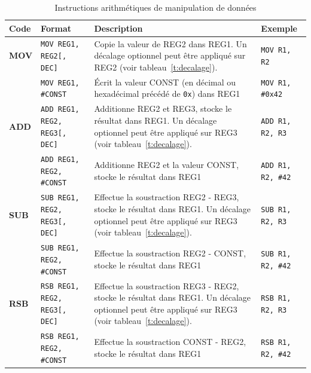 \documentclass{tufte-handout}
\begin{document}
\begin{table}
\begin{tabular}{l|l|p{7.5cm}l}
Code & Format & Description & Exemple \\ \hline
\textbf{MOV} & \texttt{MOV REG1, REG2[, DEC]} 	& Copie la valeur de REG2 dans REG1. Un décalage optionnel peut être appliqué sur REG2 (voir tableau~\ref{t:decalage}). & \texttt{MOV R1, R2} \\
 			 & \texttt{MOV REG1, \#CONST} 			& Écrit la valeur CONST (en décimal ou hexadécimal précédé de \texttt{0x}) dans REG1 & \texttt{MOV R1, \#0x42} \\
\hline
\textbf{ADD} & \texttt{ADD REG1, REG2, REG3[, DEC]} 	& Additionne REG2 et REG3, stocke le résultat dans REG1. Un décalage optionnel peut être appliqué sur REG3 (voir tableau~\ref{t:decalage}). & \texttt{ADD R1, R2, R3} \\
 			 & \texttt{ADD REG1, REG2, \#CONST} 			& Additionne REG2 et la valeur CONST, stocke le résultat dans REG1 & \texttt{ADD R1, R2, \#42} \\
\hline
\textbf{SUB} & \texttt{SUB REG1, REG2, REG3[, DEC]} 	& Effectue la soustraction REG2 - REG3, stocke le résultat dans REG1. Un décalage optionnel peut être appliqué sur REG3 (voir tableau~\ref{t:decalage}). & \texttt{SUB R1, R2, R3} \\
 			 & \texttt{SUB REG1, REG2, \#CONST} 			& Effectue la soustraction REG2 - CONST, stocke le résultat dans REG1 & \texttt{SUB R1, R2, \#42} \\
\hline
\textbf{RSB} & \texttt{RSB REG1, REG2, REG3[, DEC]} 	& Effectue la soustraction REG3 - REG2, stocke le résultat dans REG1. Un décalage optionnel peut être appliqué sur REG3 (voir tableau~\ref{t:decalage}). & \texttt{RSB R1, R2, R3} \\
 			 & \texttt{RSB REG1, REG2, \#CONST} 			& Effectue la soustraction CONST - REG2, stocke le résultat dans REG1 & \texttt{RSB R1, R2, \#42} \\
\hline

\end{tabular}
\label{t:dataarith}
\caption{Instructions arithmétiques de manipulation de données}
\end{table}
\end{document}
